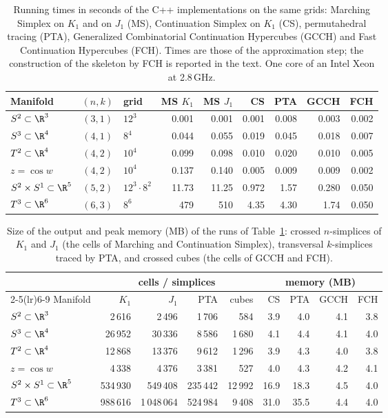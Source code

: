 \begin{table}[t]
\caption{Running times in seconds of the C++ implementations on the same grids: Marching Simplex on $K_1$ and
on $J_1$ (MS), Continuation Simplex on $K_1$ (CS), permutahedral tracing (PTA), Generalized Combinatorial
Continuation Hypercubes (GCCH) and Fast Continuation Hypercubes (FCH). Times are those of the approximation
step; the construction of the skeleton by FCH is reported in the text. One core of an Intel Xeon at 2.8\,GHz.}
\label{tab:cmp:cpp}
\centering
\small
\setlength{\tabcolsep}{4pt}
\begin{tabular}{@{}lcl rrrrrr@{}}
\toprule
Manifold & $(n,k)$ & grid & MS $K_1$ & MS $J_1$ & CS & PTA & GCCH & FCH\\
\midrule
$S^2\subset\R^3$ & $(3,1)$ & $12^3$ & 0.001 & 0.001 & 0.001 & 0.008 & 0.003 & 0.002\\
$S^3\subset\R^4$ & $(4,1)$ & $8^4$ & 0.044 & 0.055 & 0.019 & 0.045 & 0.018 & 0.007\\
$T^2\subset\R^4$ & $(4,2)$ & $10^4$ & 0.099 & 0.098 & 0.010 & 0.020 & 0.010 & 0.005\\
$z=\cos w$ & $(4,2)$ & $10^4$ & 0.137 & 0.140 & 0.005 & 0.009 & 0.009 & 0.002\\
$S^2\times S^1\subset\R^5$ & $(5,2)$ & $12^3\cdot8^2$ & 11.73 & 11.25 & 0.972 & 1.57 & 0.280 & 0.050\\
$T^3\subset\R^6$ & $(6,3)$ & $8^6$ & 479 & 510 & 4.35 & 4.30 & 1.74 & 0.050\\
\bottomrule
\end{tabular}
\end{table}
\begin{table}[t]
\caption{Size of the output and peak memory (MB) of the runs of Table~\ref{tab:cmp:cpp}: crossed $n$-simplices
of $K_1$ and $J_1$ (the cells of Marching and Continuation Simplex), transversal $k$-simplices traced by
PTA, and crossed cubes (the cells of GCCH and FCH).}
\label{tab:cmp:cppcells}
\centering
\small
\setlength{\tabcolsep}{4pt}
\begin{tabular}{@{}l rrrr rrrr@{}}
\toprule
 & \multicolumn{4}{c}{cells / simplices} & \multicolumn{4}{c}{memory (MB)}\\
\cmidrule(lr){2-5}\cmidrule(lr){6-9}
Manifold & $K_1$ & $J_1$ & PTA & cubes & CS & PTA & GCCH & FCH\\
\midrule
$S^2\subset\R^3$ & 2\,616 & 2\,496 & 1\,706 & 584 & 3.9 & 4.0 & 4.1 & 3.8\\
$S^3\subset\R^4$ & 26\,952 & 30\,336 & 8\,586 & 1\,680 & 4.1 & 4.4 & 4.1 & 4.0\\
$T^2\subset\R^4$ & 12\,868 & 13\,376 & 9\,612 & 1\,296 & 3.9 & 4.3 & 4.0 & 3.8\\
$z=\cos w$ & 4\,338 & 4\,376 & 3\,381 & 527 & 4.0 & 4.3 & 4.2 & 4.1\\
$S^2\times S^1\subset\R^5$ & 534\,930 & 549\,408 & 235\,442 & 12\,992 & 16.9 & 18.3 & 4.5 & 4.0\\
$T^3\subset\R^6$ & 988\,616 & 1\,048\,064 & 524\,984 & 9\,408 & 31.0 & 35.5 & 4.4 & 4.0\\
\bottomrule
\end{tabular}
\end{table}

